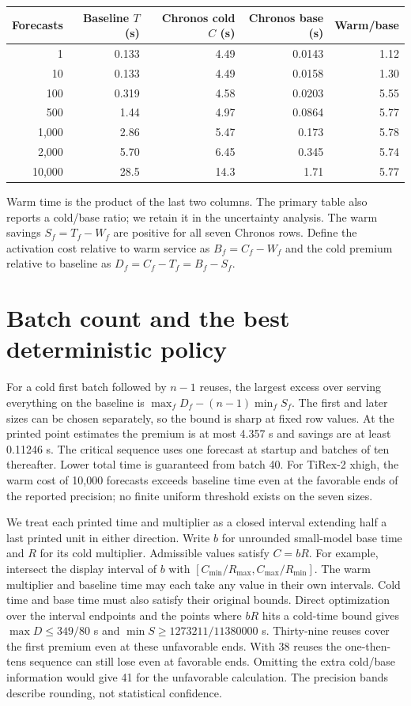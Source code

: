 \documentclass[11pt]{article}
\begin{document}
\begin{center}\small
\begin{tabular}{rrrrr}
\toprule
Forecasts & Baseline $T$ (s)& Chronos cold $C$ (s)& Chronos base (s)& Warm/base\\
\midrule
1&0.133&4.49&0.0143&1.12\\
10&0.133&4.49&0.0158&1.30\\
100&0.319&4.58&0.0203&5.55\\
500&1.44&4.97&0.0864&5.77\\
1,000&2.86&5.47&0.173&5.78\\
2,000&5.70&6.45&0.345&5.74\\
10,000&28.5&14.3&1.71&5.77\\
\bottomrule
\end{tabular}
\end{center}
Warm time is the product of the last two columns. The primary table also reports a cold/base ratio; we retain it in the uncertainty analysis. The warm savings $S_f=T_f-W_f$ are positive for all seven Chronos rows. Define the activation cost relative to warm service as $B_f=C_f-W_f$ and the cold premium relative to baseline as $D_f=C_f-T_f=B_f-S_f$.

\section{Batch count and the best deterministic policy}
For a cold first batch followed by $n-1$ reuses, the largest excess over serving everything on the baseline is $\max_f D_f-(n-1)\min_f S_f$. The first and later sizes can be chosen separately, so the bound is sharp at fixed row values. At the printed point estimates the premium is at most 4.357 s and savings are at least 0.11246 s. The critical sequence uses one forecast at startup and batches of ten thereafter. Lower total time is guaranteed from batch 40. For TiRex-2 xhigh, the warm cost of 10,000 forecasts exceeds baseline time even at the favorable ends of the reported precision; no finite uniform threshold exists on the seven sizes.

We treat each printed time and multiplier as a closed interval extending half a last printed unit in either direction. Write $b$ for unrounded small-model base time and $R$ for its cold multiplier. Admissible values satisfy $C=bR$. For example, intersect the display interval of $b$ with $[C_{\min}/R_{\max},C_{\max}/R_{\min}]$. The warm multiplier and baseline time may each take any value in their own intervals. Cold time and base time must also satisfy their original bounds. Direct optimization over the interval endpoints and the points where $bR$ hits a cold-time bound gives $\max D\le 349/80$ s and $\min S\ge 1273211/11380000$ s. Thirty-nine reuses cover the first premium even at these unfavorable ends. With 38 reuses the one-then-tens sequence can still lose even at favorable ends. Omitting the extra cold/base information would give 41 for the unfavorable calculation. The precision bands describe rounding, not statistical confidence.
\end{document}
